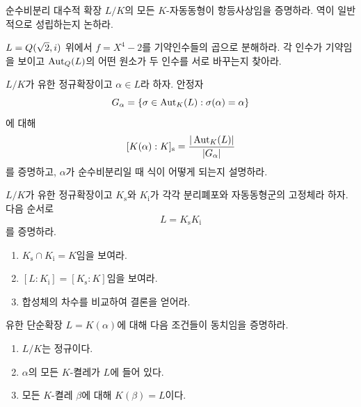 \begin{exercise}
순수비분리 대수적 확장 $L/K$의 모든 $K$-자동동형이 항등사상임을 증명하라. 역이 일반적으로 성립하는지 논하라.
\end{exercise}

\begin{exercise}[*]
$L=Q(\sqrt2,i)$ 위에서 $f=X^4-2$를 기약인수들의 곱으로 분해하라. 각 인수가 기약임을 보이고 $\operatorname{Aut}_Q(L)$의 어떤 원소가 두 인수를 서로 바꾸는지 찾아라.
\end{exercise}

\begin{exercise}
$L/K$가 유한 정규확장이고 $\alpha\in L$라 하자. 안정자
\[
  G_\alpha=\{\sigma\in\operatorname{Aut}_K(L):\sigma(\alpha)=\alpha\}
\]
에 대해
\[
  [K(\alpha):K]_{\mathrm s}
  =\frac{|\operatorname{Aut}_K(L)|}{|G_\alpha|}
\]
를 증명하고, $\alpha$가 순수비분리일 때 식이 어떻게 되는지 설명하라.
\end{exercise}

\begin{exercise}[*]
$L/K$가 유한 정규확장이고 $K_{\mathrm s}$와 $K_{\mathrm i}$가 각각 분리폐포와 자동동형군의 고정체라 하자. 다음 순서로
\[
  L=K_{\mathrm s}K_{\mathrm i}
\]
를 증명하라.
\begin{enumerate}[label=(\alph*)]
  \item $K_{\mathrm s}\cap K_{\mathrm i}=K$임을 보여라.
  \item $[L:K_{\mathrm i}]=[K_{\mathrm s}:K]$임을 보여라.
  \item 합성체의 차수를 비교하여 결론을 얻어라.
\end{enumerate}
\end{exercise}

\begin{exercise}
유한 단순확장 $L=K(\alpha)$에 대해 다음 조건들이 동치임을 증명하라.
\begin{enumerate}[label=(\roman*)]
  \item $L/K$는 정규이다.
  \item $\alpha$의 모든 $K$-켤레가 $L$에 들어 있다.
  \item 모든 $K$-켤레 $\beta$에 대해 $K(\beta)=L$이다.
\end{enumerate}
\end{exercise}
